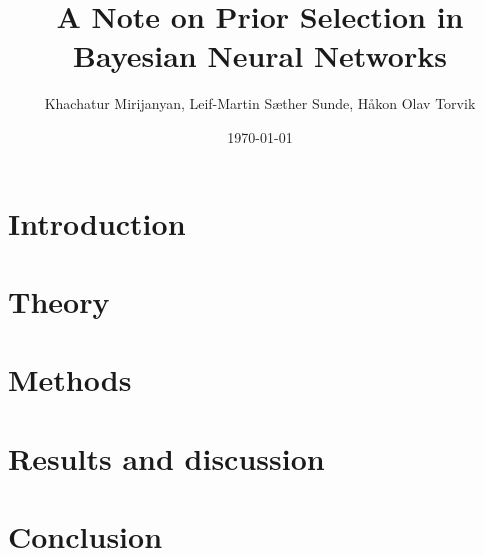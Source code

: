 \documentclass[twocolumn,nofootinbib,nobalancelastpage,10pt]{revtex4-1}
\begin{document}
\title{A Note on Prior Selection in Bayesian Neural Networks}

\author{Khachatur Mirijanyan, Leif-Martin Sæther Sunde, Håkon Olav Torvik}

\affiliation{}

\begin{abstract}
\end{abstract}

\date{\today}

\maketitle

\section{Introduction}

\section{Theory}

\section{Methods}

\section{Results and discussion}

\section{Conclusion}



\end{document}
